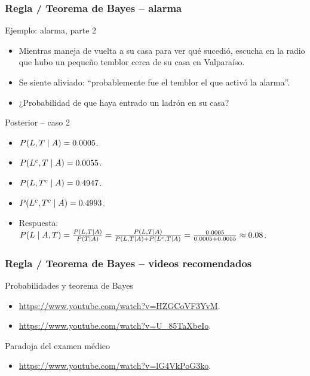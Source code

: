 \documentclass[table]{beamer}
\begin{document}
\begin{frame}
    \frametitle{Regla / Teorema de Bayes -- alarma}
    \begin{block}{Ejemplo: alarma, parte 2}
        \begin{itemize}
            \item Mientras maneja de vuelta a su casa para ver qué sucedió, escucha en la radio que hubo un pequeño temblor cerca de su casa en Valparaíso.
            \item Se siente aliviado: ``probablemente fue el temblor el que activó la alarma''.
            \item ¿Probabilidad de que haya entrado un ladrón en su casa?
        \end{itemize}
    \end{block}
    \begin{block}{Posterior -- caso 2}
        \begin{itemize}
            \item $\prob{L, T \mid A} = 0.0005$.
            \item $\prob{L^{c}, T \mid A} = 0.0055$.
            \item $\prob{L, T^{c} \mid A} = 0.4947$.
            \item $\prob{L^{c}, T^{c} \mid A} = 0.4993$.
            \item Respuesta: $\prob{L \mid A, T} = \frac{\prob{L, T \mid A}}{\prob{T \mid A}}
                = \frac{\prob{L, T \mid A}}{\prob{L, T \mid A} + \prob{L^{c}, T \mid A}}
                = \frac{0.0005}{0.0005 + 0.0055} \approx 0.08$.
        \end{itemize}
    \end{block}
\end{frame}

\begin{frame}
    \frametitle{Regla / Teorema de Bayes -- videos recomendados}
    \begin{block}{Probabilidades y teorema de Bayes}
        \begin{itemize}
            \item \url{https://www.youtube.com/watch?v=HZGCoVF3YvM}.
            \item \url{https://www.youtube.com/watch?v=U_85TaXbeIo}.
        \end{itemize}
    \end{block}
    \begin{block}{Paradoja del examen médico}
        \begin{itemize}
            \item \url{https://www.youtube.com/watch?v=lG4VkPoG3ko}.
        \end{itemize}
    \end{block}
\end{frame}
\end{document}
